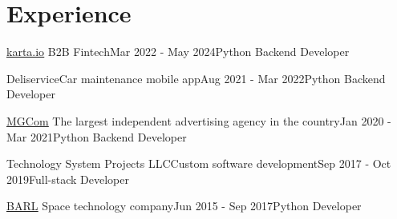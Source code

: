 \section{Experience}

\begin{experienceEntry}
{\href{https://karta.io}{\underline{karta.io}}}
{B2B Fintech}{Mar 2022 - May 2024}{Python Backend Developer}
    {}
\end{experienceEntry}

\vspace{1em}

\begin{experienceEntry}{Deliservice}{Car maintenance mobile app}{Aug 2021 - Mar 2022}{Python Backend Developer}
    {}
\end{experienceEntry}

\vspace{1em}

\begin{experienceEntry}
{\href{https://mgcom.ru}{\underline{MGCom}}}
{The largest independent advertising agency in the country}{Jan 2020 - Mar 2021}{Python Backend Developer}
    {}
\end{experienceEntry}

\vspace{1em}

\begin{experienceEntry}{Technology System Projects LLC}{Custom software development}{Sep 2017 - Oct 2019}{Full-stack Developer}
    {}
\end{experienceEntry}

\vspace{1em}

\begin{experienceEntry}
{\href{https://barl.ru}{\underline{BARL}}}
{Space technology company}{Jun 2015 - Sep 2017}{Python Developer}
    {}
\end{experienceEntry}

